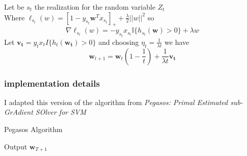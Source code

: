Let be $s_t$ the realization for the random variable $Z_t$\\ 
Where $\ell_{s_t}(w) = \left[1 - y_{s_t} \boldsymbol{w}^T x_{s_t}\right]_+ + \frac{\lambda}{2} ||w||^2$ so
$$\nabla\ell_{s_t}(w) = -y_{s_t} x_{s_t} \mathbb{I}\{h_{s_t}(\boldsymbol{w}) > 0\} + \lambda w $$
Let $\boldsymbol{v_t} = y_t x_t I\{h_t(\boldsymbol{w_t}) > 0\}$ and choosing $\eta_t = \frac{1}{\lambda t}$ we have
$$\boldsymbol{w}_{t+1} = \boldsymbol{w}_t (1 - \frac{1}{t}) + \frac{1}{\lambda t} \boldsymbol{v_t}$$

\subsubsection{implementation details}
I adapted this version of the algorithm from \textit{Pegasos: Primal Estimated sub-GrAdient SOlver for SVM}\cite{Pegasos_paper}\\

\begin{algorithm}[H]
    \SetAlgoLined
    \DontPrintSemicolon
    \caption{Pegasos Algorithm}
    Output $\boldsymbol{w}_{T+1}$
\end{algorithm}

